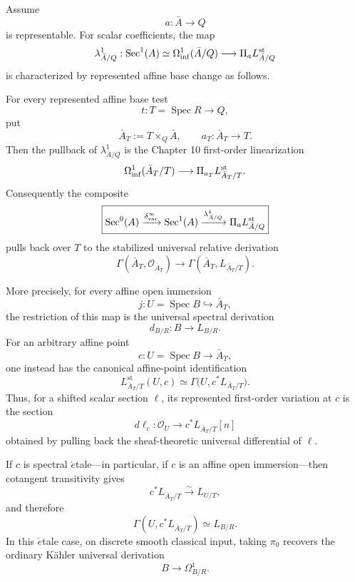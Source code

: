 \begin{proposition}
\label{prop:var-first-contact-coefficient}
Assume
\[
    a:\bar A\longrightarrow Q
\]
is representable.  For scalar coefficients, the map
\[
    \lambda^1_{\bar A/Q}:
    \operatorname{Sec}^1(A)
    \simeq
    \Omega_{\mathrm{inf}}^1(\bar A/Q)
    \longrightarrow
    \Pi_aL^{\mathrm{st}}_{\bar A/Q}
\]
is characterized by represented affine base change as follows.

For every represented affine base test
\[
    t:T=\operatorname{Spec}R\longrightarrow Q,
\]
put
\[
    \bar A_T:=T\times_Q\bar A,
    \qquad
    a_T:\bar A_T\longrightarrow T.
\]
Then the pullback of \(\lambda^1_{\bar A/Q}\) is the Chapter 10 first-order linearization
\[
    \Omega_{\mathrm{inf}}^1(\bar A_T/T)
    \longrightarrow
    \Pi_{a_T}L^{\mathrm{st}}_{\bar A_T/T}.
\]
Consequently the composite
\[
    \boxed{
    \operatorname{Sec}^0(A)
    \xrightarrow{\delta^\infty_{\mathrm{var}}}
    \operatorname{Sec}^1(A)
    \xrightarrow{\lambda^1_{\bar A/Q}}
    \Pi_aL^{\mathrm{st}}_{\bar A/Q}
    }
\]
pulls back over \(T\) to the stabilized universal relative derivation
\[
    \Gamma(\bar A_T,\mathcal O_{\bar A_T})
    \longrightarrow
    \Gamma(\bar A_T,L_{\bar A_T/T}).
\]

More precisely, for every affine open immersion
\[
    j:U=\operatorname{Spec}B
    \hookrightarrow
    \bar A_T,
\]
the restriction of this map is the universal spectral derivation
\[
    \boxed{
    d_{B/R}:
    B\longrightarrow L_{B/R}.
    }
\]
For an arbitrary affine point
\[
    c:U=\operatorname{Spec}B
    \longrightarrow
    \bar A_T,
\]
one instead has the canonical affine-point identification
\[
    \boxed{
    L^{\mathrm{st}}_{\bar A_T/T}(U,c)
    \simeq
    \Gamma\bigl(U,c^*L_{\bar A_T/T}\bigr).
    }
\]
Thus, for a shifted scalar section \(\ell\), its represented first-order variation at \(c\) is the section
\[
    d\ell_c:
    \mathcal O_U
    \longrightarrow
    c^*L_{\bar A_T/T}[n]
\]
obtained by pulling back the sheaf-theoretic universal differential of \(\ell\).

If \(c\) is spectral \(\acute{e}\)tale---in particular, if \(c\) is an affine open immersion---then cotangent transitivity gives
\[
    c^*L_{\bar A_T/T}
    \xrightarrow{\sim}
    L_{U/T},
\]
and therefore
\[
    \Gamma(U,c^*L_{\bar A_T/T})
    \simeq
    L_{B/R}.
\]
In this \(\acute{e}\)tale case, on discrete smooth classical input, taking \(\pi_0\) recovers the ordinary K\"ahler universal derivation
\[
    B\longrightarrow\Omega^1_{B/R}.
\]
\end{proposition}

